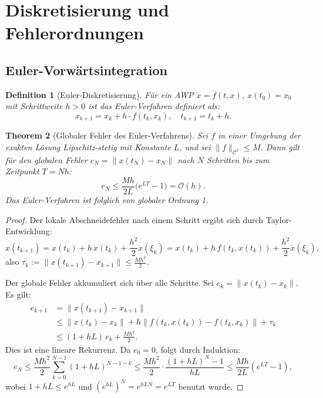 ﻿\documentclass[12pt,a4paper]{article}
\newtheorem{theorem}{Theorem}[section]
\newtheorem{definition}[theorem]{Definition}
\theoremstyle{definition}
\begin{document}
\section{Diskretisierung und Fehlerordnungen}
\label{sec:diskret}


\subsection{Euler-Vorwärtsintegration}

\begin{definition}[Euler-Diskretisierung]
Für ein AWP $\dot{x} = f(t,x)$, $x(t_0) = x_0$ mit Schrittweite $h > 0$
ist das Euler-Verfahren definiert als:
\[
  x_{k+1} = x_k + h \cdot f(t_k, x_k), \quad t_{k+1} = t_k + h.
\]
\end{definition}

\begin{theorem}[Globaler Fehler des Euler-Verfahrens]
\label{thm:euler}
Sei $f$ in einer Umgebung der exakten Lösung Lipschitz-stetig mit Konstante $L$,
und sei $\|f\|_{\mathcal{C}^2} \leq M$. Dann gilt für den globalen Fehler
$e_N = \|x(t_N) - x_N\|$ nach $N$ Schritten bis zum Zeitpunkt $T = Nh$:
\[
  e_N \leq \frac{Mh}{2L}\bigl(e^{LT} - 1\bigr) = \mathcal{O}(h).
\]
Das Euler-Verfahren ist folglich von globaler Ordnung 1.
\end{theorem}

\begin{proof}
Der lokale Abschneidefehler nach einem Schritt ergibt sich durch Taylor-Entwicklung:
\[
  x(t_{k+1}) = x(t_k) + h\,\dot{x}(t_k) + \frac{h^2}{2}\ddot{x}(\xi_k)
  = x(t_k) + h\,f(t_k, x(t_k)) + \frac{h^2}{2}\ddot{x}(\xi_k),
\]
also $\tau_k := \|x(t_{k+1}) - x_{k+1}\| \leq \frac{Mh^2}{2}$.

Der globale Fehler akkumuliert sich über alle Schritte. Sei
$e_k = \|x(t_k) - x_k\|$. Es gilt:
\begin{align*}
  e_{k+1} &= \|x(t_{k+1}) - x_{k+1}\| \\
           &\leq \|x(t_k) - x_k\| + h\|f(t_k,x(t_k)) - f(t_k,x_k)\| + \tau_k \\
           &\leq (1 + hL)\,e_k + \frac{Mh^2}{2}.
\end{align*}
Dies ist eine lineare Rekurrenz. Da $e_0 = 0$, folgt durch Induktion:
\[
  e_N \leq \frac{Mh^2}{2} \sum_{k=0}^{N-1} (1+hL)^{N-1-k}
        \leq \frac{Mh^2}{2} \cdot \frac{(1+hL)^N - 1}{hL}
        \leq \frac{Mh}{2L}(e^{LT}-1),
\]
wobei $1 + hL \leq e^{hL}$ und $(e^{hL})^N = e^{hLN} = e^{LT}$ benutzt wurde.
\end{proof}
\end{document}
